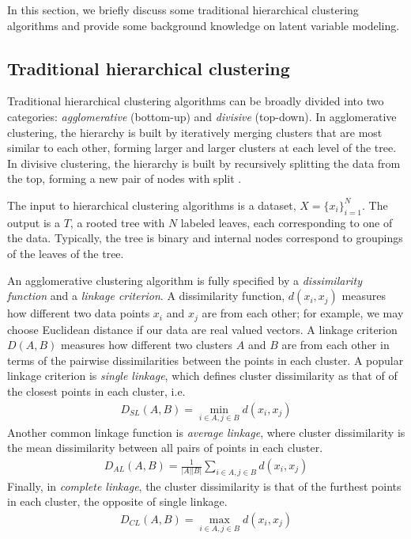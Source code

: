 \documentclass{article}
\begin{document}
In this section, we briefly discuss
some traditional hierarchical clustering algorithms
and provide some
background knowledge on latent variable modeling.

\subsection{Traditional hierarchical clustering}
Traditional hierarchical clustering algorithms
can be broadly divided into two categories:
\emph{agglomerative} (bottom-up) and \emph{divisive} (top-down).
In agglomerative clustering, the hierarchy
is built by iteratively merging clusters
that are most similar to each other, forming
larger and larger clusters at each level
of the tree.
In divisive clustering,
the hierarchy is built by recursively
splitting the data from the top,
forming a new pair of nodes with 
split \cite{Hastie2009}.

The input to hierarchical clustering algorithms
is a dataset, $X = \{x_i\}_{i = 1}^N$.
The output is a $T$,
a rooted tree with $N$
labeled leaves,
each corresponding to one of the data.
Typically, the tree is binary
and internal nodes correspond
to groupings of the leaves
of the tree.

An agglomerative clustering algorithm is fully specified
by a \emph{dissimilarity function} and a \emph{linkage criterion}.
A dissimilarity function,
$d(x_i, x_j)$ measures
how different two data points $x_i$ and $x_j$ are from each other;
for example, we may choose Euclidean distance 
if our data are real valued vectors.
A linkage criterion $D(A, B)$ measures how different two clusters
$A$ and $B$
are from each other in terms of the pairwise
dissimilarities between the points in each cluster.
A popular linkage criterion is
\emph{single linkage}, which defines
cluster dissimilarity
as that of
of the closest points in 
each cluster,
i.e.
\begin{align}
  D_{SL}(A, B) = \min_{i\in A, j \in B} d(x_i, x_j)
\end{align}
Another common linkage function is \emph{average linkage}, 
where cluster dissimilarity is
the mean dissimilarity between
all pairs of points in each cluster.
\begin{align}
  D_{AL}(A, B) = \frac{1}{|A||B|}\sum_{i\in A, j \in B} d(x_i, x_j)
\end{align}
Finally, in \emph{complete linkage}, the cluster
dissimilarity
is that of the furthest points in each cluster,
the opposite of single linkage.
\begin{align}
  D_{CL}(A, B) = \max_{i\in A, j \in B} d(x_i, x_j)
\end{align}
\end{document}
